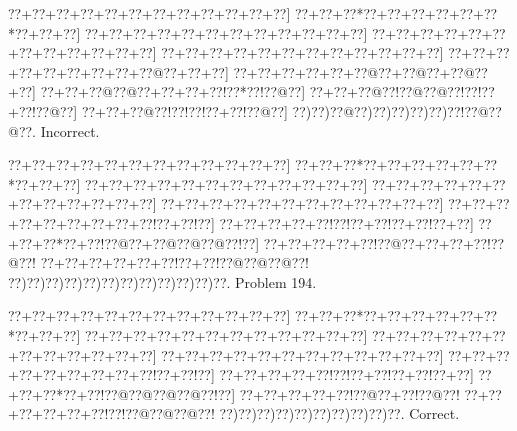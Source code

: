 \documentclass[a5paper]{article}
\begin{document}
\begin{center}
{\goo
\0??+\0??+\0??+\0??+\0??+\0??+\0??+\0??+\0??+\0??+\0??+\0??]
\0??+\0??+\0??*\0??+\0??+\0??+\0??+\0??+\0??*\0??+\0??+\0??]
\0??+\0??+\0??+\0??+\0??+\0??+\0??+\0??+\0??+\0??+\0??+\0??]
\0??+\0??+\0??+\0??+\0??+\0??+\0??+\0??+\0??+\0??+\0??+\0??]
\0??+\0??+\0??+\0??+\0??+\0??+\0??+\0??+\0??+\0??+\0??+\0??]
\0??+\0??+\0??+\0??+\0??+\0??+\0??+\0??+\0??@\0??+\0??+\0??]
\0??+\0??+\0??+\0??+\0??+\0??@\0??+\0??@\0??+\0??@\0??+\0??]
\0??+\0??+\0??@\0??@\0??+\0??+\0??+\0??!\0??*\0??!\0??@\0??]
\0??+\0??+\0??@\0??!\0??@\0??@\0??!\0??!\0??+\0??!\0??@\0??]
\0??+\0??+\0??@\0??!\0??!\0??!\0??+\0??!\0??@\0??]
\0??)\0??)\0??@\0??)\0??)\0??)\0??)\0??)\0??!\0??@\0??@\0??.
}
Incorrect. 

\end{center}
\newpage
\begin{center}
{\goo
\0??+\0??+\0??+\0??+\0??+\0??+\0??+\0??+\0??+\0??+\0??+\0??]
\0??+\0??+\0??*\0??+\0??+\0??+\0??+\0??+\0??*\0??+\0??+\0??]
\0??+\0??+\0??+\0??+\0??+\0??+\0??+\0??+\0??+\0??+\0??+\0??]
\0??+\0??+\0??+\0??+\0??+\0??+\0??+\0??+\0??+\0??+\0??+\0??]
\0??+\0??+\0??+\0??+\0??+\0??+\0??+\0??+\0??+\0??+\0??+\0??]
\0??+\0??+\0??+\0??+\0??+\0??+\0??+\0??+\0??!\0??+\0??!\0??]
\0??+\0??+\0??+\0??+\0??!\0??!\0??+\0??!\0??+\0??!\0??+\0??]
\0??+\0??+\0??*\0??+\0??!\0??@\0??+\0??@\0??@\0??@\0??!\0??]
\0??+\0??+\0??+\0??+\0??!\0??@\0??+\0??+\0??+\0??!\0??@\0??!
\0??+\0??+\0??+\0??+\0??+\0??!\0??+\0??!\0??@\0??@\0??@\0??!
\0??)\0??)\0??)\0??)\0??)\0??)\0??)\0??)\0??)\0??)\0??)\0??.
}
Problem 194.

\end{center}
\begin{center}
{\goo
\0??+\0??+\0??+\0??+\0??+\0??+\0??+\0??+\0??+\0??+\0??+\0??]
\0??+\0??+\0??*\0??+\0??+\0??+\0??+\0??+\0??*\0??+\0??+\0??]
\0??+\0??+\0??+\0??+\0??+\0??+\0??+\0??+\0??+\0??+\0??+\0??]
\0??+\0??+\0??+\0??+\0??+\0??+\0??+\0??+\0??+\0??+\0??+\0??]
\0??+\0??+\0??+\0??+\0??+\0??+\0??+\0??+\0??+\0??+\0??+\0??]
\0??+\0??+\0??+\0??+\0??+\0??+\0??+\0??+\0??!\0??+\0??!\0??]
\0??+\0??+\0??+\0??+\0??!\0??!\0??+\0??!\0??+\0??!\0??+\0??]
\0??+\0??+\0??*\0??+\0??!\0??@\0??@\0??@\0??@\0??!\0??]
\0??+\0??+\0??+\0??+\0??!\0??@\0??+\0??!\0??@\0??!
\0??+\0??+\0??+\0??+\0??+\0??!\0??!\0??@\0??@\0??@\0??!
\0??)\0??)\0??)\0??)\0??)\0??)\0??)\0??)\0??)\0??.
}
Correct. 

\end{center}
\end{document}
